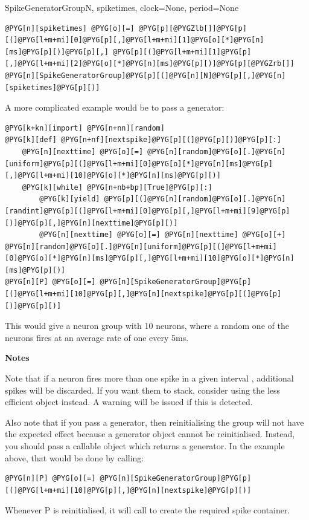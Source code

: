 \documentclass[letterpaper,10pt,english]{manual}
\begin{document}
\begin{classdesc}{SpikeGeneratorGroup}{N, spiketimes, clock=None, period=None}
\begin{Verbatim}[commandchars=@\[\]]
@PYG[n][spiketimes] @PYG[o][=] @PYG[p][@PYGZlb[]]@PYG[p][(]@PYG[l+m+mi][0]@PYG[p][,]@PYG[l+m+mi][1]@PYG[o][*]@PYG[n][ms]@PYG[p][)]@PYG[p][,] @PYG[p][(]@PYG[l+m+mi][1]@PYG[p][,]@PYG[l+m+mi][2]@PYG[o][*]@PYG[n][ms]@PYG[p][)]@PYG[p][@PYGZrb[]]
@PYG[n][SpikeGeneratorGroup]@PYG[p][(]@PYG[n][N]@PYG[p][,]@PYG[n][spiketimes]@PYG[p][)]
\end{Verbatim}

A more complicated example would be to pass a generator:

\begin{Verbatim}[commandchars=@\[\]]
@PYG[k+kn][import] @PYG[n+nn][random]
@PYG[k][def] @PYG[n+nf][nextspike]@PYG[p][(]@PYG[p][)]@PYG[p][:]
    @PYG[n][nexttime] @PYG[o][=] @PYG[n][random]@PYG[o][.]@PYG[n][uniform]@PYG[p][(]@PYG[l+m+mi][0]@PYG[o][*]@PYG[n][ms]@PYG[p][,]@PYG[l+m+mi][10]@PYG[o][*]@PYG[n][ms]@PYG[p][)]
    @PYG[k][while] @PYG[n+nb+bp][True]@PYG[p][:]
        @PYG[k][yield] @PYG[p][(]@PYG[n][random]@PYG[o][.]@PYG[n][randint]@PYG[p][(]@PYG[l+m+mi][0]@PYG[p][,]@PYG[l+m+mi][9]@PYG[p][)]@PYG[p][,]@PYG[n][nexttime]@PYG[p][)]
        @PYG[n][nexttime] @PYG[o][=] @PYG[n][nexttime] @PYG[o][+] @PYG[n][random]@PYG[o][.]@PYG[n][uniform]@PYG[p][(]@PYG[l+m+mi][0]@PYG[o][*]@PYG[n][ms]@PYG[p][,]@PYG[l+m+mi][10]@PYG[o][*]@PYG[n][ms]@PYG[p][)]
@PYG[n][P] @PYG[o][=] @PYG[n][SpikeGeneratorGroup]@PYG[p][(]@PYG[l+m+mi][10]@PYG[p][,]@PYG[n][nextspike]@PYG[p][(]@PYG[p][)]@PYG[p][)]
\end{Verbatim}

This would give a neuron group  with 10 neurons, where a random one
of the neurons fires at an average rate of one every 5ms.

\textbf{Notes}

Note that if a neuron fires more than one spike in a given interval , additional
spikes will be discarded. If you want them to stack, consider using the less efficient
\hyperlink{brian.MultipleSpikeGeneratorGroup}{} object instead. A warning will be issued if this
is detected.

Also note that if you pass a generator, then reinitialising the group will not have the
expected effect because a generator object cannot be reinitialised. Instead, you should
pass a callable object which returns a generator. In the example above, that would be
done by calling:

\begin{Verbatim}[commandchars=@\[\]]
@PYG[n][P] @PYG[o][=] @PYG[n][SpikeGeneratorGroup]@PYG[p][(]@PYG[l+m+mi][10]@PYG[p][,]@PYG[n][nextspike]@PYG[p][)]
\end{Verbatim}

Whenever P is reinitialised, it will call  to create the required spike
container.
\end{classdesc}
\end{document}
